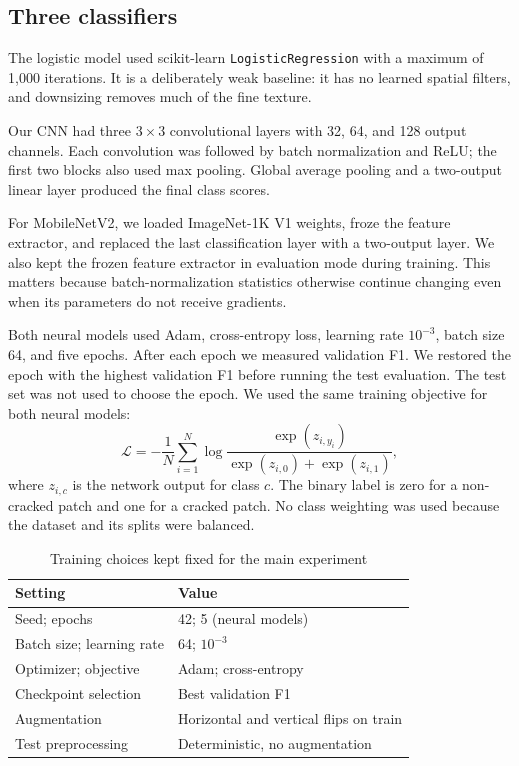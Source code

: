 \documentclass[conference,letterpaper]{IEEEtran}
\begin{document}
\subsection{Three classifiers}
The logistic model used scikit-learn \texttt{LogisticRegression} with a maximum of 1,000 iterations. It is a deliberately weak baseline: it has no learned spatial filters, and downsizing removes much of the fine texture.

Our CNN had three $3\times3$ convolutional layers with 32, 64, and 128 output channels. Each convolution was followed by batch normalization and ReLU; the first two blocks also used max pooling. Global average pooling and a two-output linear layer produced the final class scores.

For MobileNetV2, we loaded ImageNet-1K V1 weights, froze the feature extractor, and replaced the last classification layer with a two-output layer. We also kept the frozen feature extractor in evaluation mode during training. This matters because batch-normalization statistics otherwise continue changing even when its parameters do not receive gradients.

Both neural models used Adam, cross-entropy loss, learning rate $10^{-3}$, batch size 64, and five epochs. After each epoch we measured validation F1. We restored the epoch with the highest validation F1 before running the test evaluation. The test set was not used to choose the epoch. We used the same training objective for both neural models:
\begin{equation}
\mathcal L=-\frac{1}{N}\sum_{i=1}^N\log\frac{\exp(z_{i,y_i})}{\exp(z_{i,0})+\exp(z_{i,1})},
\end{equation}
where $z_{i,c}$ is the network output for class $c$. The binary label is zero for a non-cracked patch and one for a cracked patch. No class weighting was used because the dataset and its splits were balanced.

\begin{table}[!t]
\centering
\caption{Training choices kept fixed for the main experiment}
\label{tab:settings}
\footnotesize
\begin{tabular}{ll}
\toprule
Setting & Value \\
\midrule
Seed; epochs & 42; 5 (neural models) \\
Batch size; learning rate & 64; $10^{-3}$ \\
Optimizer; objective & Adam; cross-entropy \\
Checkpoint selection & Best validation F1 \\
Augmentation & Horizontal and vertical flips on train \\
Test preprocessing & Deterministic, no augmentation \\
\bottomrule
\end{tabular}
\end{table}
\end{document}
